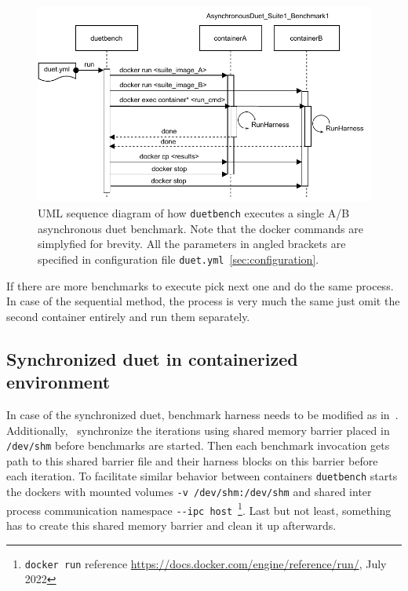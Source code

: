 \begin{figure}
	\centering
	\includegraphics[width=\linewidth]{./figures/duetbench-sequence.drawio.pdf}
	\caption{
        UML sequence diagram of how \lstinline{duetbench} executes a single A/B asynchronous duet benchmark.
        Note that the docker commands are simplyfied for brevity.
        All the parameters in angled brackets are specified in configuration file \lstinline{duet.yml}~\cref{sec:configuration}.
	}
	\label{fig:duetbench_sequence}
\end{figure}

If there are more benchmarks to execute pick next one and do the same process.
In case of the sequential method, the process is very much the same just omit the second container entirely and run them separately.

\subsection{Synchronized duet in containerized environment}

In case of the synchronized duet, benchmark harness needs to be modified as in~\citet{bulej2020duet}.
Additionally,~\citet{bulej2020duet} synchronize the iterations using shared memory barrier placed in \lstinline{/dev/shm} before benchmarks are started.
Then each benchmark invocation gets path to this shared barrier file and their harness blocks on this barrier before each iteration.
To facilitate similar behavior between containers \lstinline{duetbench} starts the dockers with mounted volumes \lstinline{-v /dev/shm:/dev/shm} and shared inter process communication namespace \lstinline{--ipc host}~\footnote{\lstinline{docker run} reference \url{https://docs.docker.com/engine/reference/run/}, July 2022}.
Last but not least, something has to create this shared memory barrier and clean it up afterwards.

